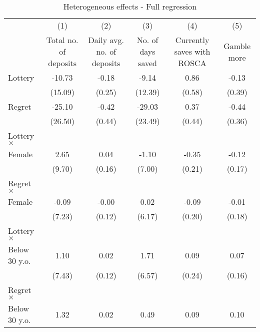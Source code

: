 \begin{table}[htbp]\centering
\def\sym#1{\ifmmode^{#1}\else\(^{#1}\)\fi}
\caption{Heterogeneous effects - Full regression}
\begin{tabular}{l*{5}{c}}
\toprule
                &\multicolumn{1}{c}{(1)}&\multicolumn{1}{c}{(2)}&\multicolumn{1}{c}{(3)}&\multicolumn{1}{c}{(4)}&\multicolumn{1}{c}{(5)}\\
                &\multicolumn{1}{c}{Total no. of deposits}&\multicolumn{1}{c}{Daily avg. no. of deposits}&\multicolumn{1}{c}{No. of days saved}&\multicolumn{1}{c}{Currently saves with ROSCA}&\multicolumn{1}{c}{Gamble more}\\
\midrule
Lottery         &   -10.73         &    -0.18         &    -9.14         &     0.86         &    -0.13         \\
                &  (15.09)         &   (0.25)         &  (12.39)         &   (0.58)         &   (0.39)         \\
\addlinespace
Regret          &   -25.10         &    -0.42         &   -29.03         &     0.37         &    -0.44         \\
                &  (26.50)         &   (0.44)         &  (23.49)         &   (0.44)         &   (0.36)         \\
\addlinespace
Lottery $\times$ \\ Female&     2.65         &     0.04         &    -1.10         &    -0.35         &    -0.12         \\
                &   (9.70)         &   (0.16)         &   (7.00)         &   (0.21)         &   (0.17)         \\
\addlinespace
Regret $\times$ \\ Female&    -0.09         &    -0.00         &     0.02         &    -0.09         &    -0.01         \\
                &   (7.23)         &   (0.12)         &   (6.17)         &   (0.20)         &   (0.18)         \\
\addlinespace
Lottery $\times$ \\ Below 30 y.o.&     1.10         &     0.02         &     1.71         &     0.09         &     0.07         \\
                &   (7.43)         &   (0.12)         &   (6.57)         &   (0.24)         &   (0.16)         \\
\addlinespace
Regret $\times$ \\ Below 30 y.o.&     1.32         &     0.02         &     0.49         &     0.09         &     0.10         \\

\end{tabular}
\end{table}
